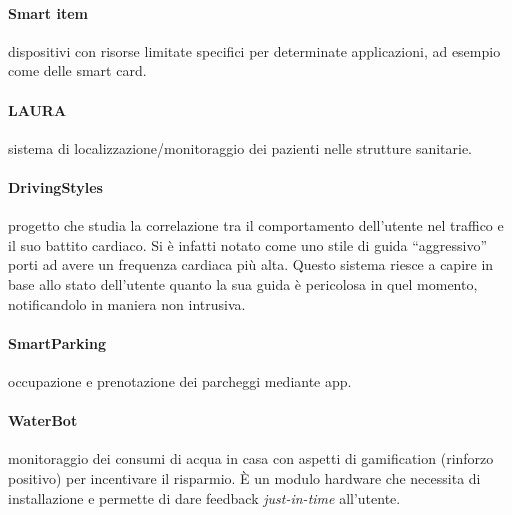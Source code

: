 \paragraph*{Smart item} dispositivi con risorse limitate specifici per
determinate applicazioni, ad esempio come delle smart card.

\paragraph*{LAURA} sistema di localizzazione/monitoraggio dei pazienti nelle
strutture sanitarie.

\paragraph*{DrivingStyles} progetto che studia la correlazione tra il
comportamento dell'utente nel traffico e il suo battito cardiaco. Si è infatti 
notato come uno stile di guida ``aggressivo'' porti ad avere un frequenza 
cardiaca più alta. Questo sistema riesce a capire in base allo stato 
dell'utente quanto la sua guida è pericolosa in quel momento, notificandolo in 
maniera non intrusiva. 

\paragraph*{SmartParking} occupazione e prenotazione dei parcheggi mediante
app.

\paragraph*{WaterBot} monitoraggio dei consumi di acqua in casa con aspetti
di gamification (rinforzo positivo) per incentivare il risparmio. È un modulo 
hardware che necessita di installazione e permette di dare feedback 
\textit{just-in-time} all'utente.

